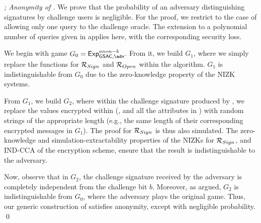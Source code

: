 \begin{proof}[; Anonymity of \GSACGen]
  We prove that the probability of an adversary distinguishing signatures by
  challenge users is negligible. For the proof, we restrict to the case of
  allowing only one query to the challenge oracle. The extension to a polynomial
  number of queries given in \cite{bsz05} applies here, with the corresponding
  security loss.

  We begin with game $G_0=\ExpGSACAnonb$. From it, we build $G_1$, where we
  simply replace the \NIZKSetup functions for $\mathcal{R}_{Sign}$ and
  $\mathcal{R}_{Open}$ within the \Setup algorithm. $G_1$ is indistinguishable
  from $G_0$ due to the zero-knowledge property of the NIZK systems.

  From $G_1$, we build $G_2$, where within the challenge signature produced by
  \CHALb, we replace the values encrypted within \Sign (\Ccom, and all the
  attributes in \attrs) with random strings of the appropriate length (e.g.,
  the same length of their corresponding encrypted messages in $G_1$). The
  proof for $\mathcal{R}_{Sign}$ is thus
  also simulated. The zero-knowledge and simulation-extractability properties
  of the NIZKs for $\mathcal{R}_{Sign}$, and IND-CCA of the encryption
  scheme, ensure that the result is indistinguishable to the adversary.

  Now, observe that in $G_2$, the challenge signature received by the adversary
  is completely independent from the challenge bit $b$. Moreover, as argued,
  $G_2$ is indistinguishable from $G_0$, where the adversary plays the original
  \ExpGSACAnonb game. Thus, our generic construction of \GSAC satisfies
  anonymity, except with negligible probability.
  \qed
\end{proof}

